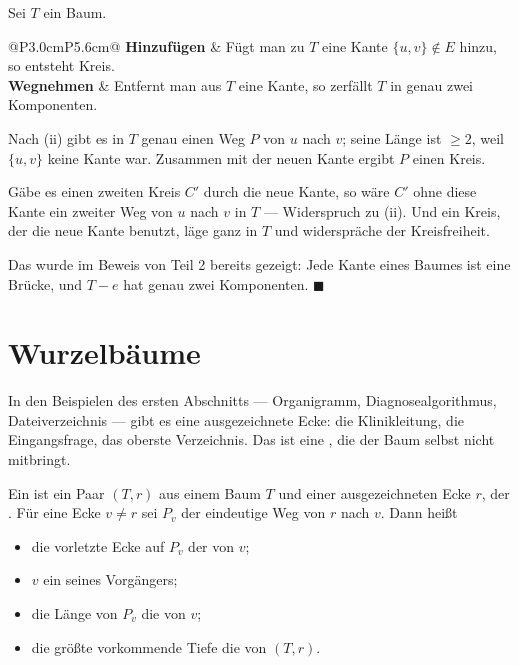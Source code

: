 \begin{merksatz}
Sei $T$ ein Baum.
\begin{center}
\renewcommand{\arraystretch}{1.55}
\begin{tabular}{@{}P{3.0cm}P{5.6cm}@{}}
\toprule
\textbf{Hinzufügen} & Fügt man zu $T$ eine Kante $\{u,v\} \notin E$ hinzu, so entsteht  Kreis.\\
\textbf{Wegnehmen} & Entfernt man aus $T$ eine Kante, so zerfällt $T$ in genau zwei Komponenten.\\
\bottomrule
\end{tabular}
\end{center}

Nach (ii) gibt es in $T$ genau einen Weg $P$ von $u$ nach $v$; seine Länge ist $\ge 2$, weil $\{u,v\}$ keine Kante war. Zusammen mit der neuen Kante ergibt $P$ einen Kreis.

Gäbe es einen zweiten Kreis $C'$ durch die neue Kante, so wäre $C'$ ohne diese Kante ein zweiter Weg von $u$ nach $v$ in $T$ --- Widerspruch zu (ii). Und ein Kreis, der die neue Kante  benutzt, läge ganz in $T$ und widerspräche der Kreisfreiheit.

Das wurde im Beweis von Teil 2 bereits gezeigt: Jede Kante eines Baumes ist eine Brücke, und $T - e$ hat genau zwei Komponenten. $\blacksquare$
\end{merksatz}

\section{Wurzelbäume}

In den Beispielen des ersten Abschnitts --- Organigramm, Diagnosealgorithmus, Dateiverzeichnis --- gibt es eine ausgezeichnete Ecke: die Klinikleitung, die Eingangsfrage, das oberste Verzeichnis. Das ist eine , die der Baum selbst nicht mitbringt.

\begin{definition}
Ein  ist ein Paar $(T, r)$ aus einem Baum $T$ und einer ausgezeichneten Ecke $r$, der . Für eine Ecke $v \neq r$ sei $P_v$ der eindeutige Weg von $r$ nach $v$. Dann heißt
\begin{itemize}[leftmargin=1.4em, itemsep=3pt]
\item die vorletzte Ecke auf $P_v$ der  von $v$;
\item $v$ ein  seines Vorgängers;
\item die Länge von $P_v$ die  von $v$;
\item die größte vorkommende Tiefe die  von $(T,r)$.
\end{itemize}
\end{definition}

